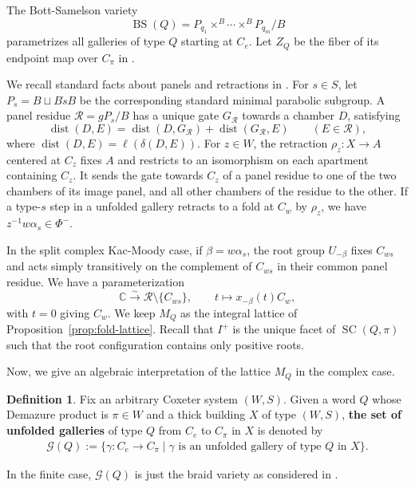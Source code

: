 \documentclass[11pt,a4paper]{article}
\theoremstyle{definition}
\newtheorem{definition}[theorem]{Definition}
\theoremstyle{remark}
\numberwithin{equation}{section}
\newcommand{\SCQ}{\operatorname{SC}(Q,\pi)}
\newcommand{\C}{\mathbb C}
\begin{document}
The Bott-Samelson variety
\[
 \operatorname{BS}(Q)=P_{q_1}\times^B\cdots\times^B P_{q_m}/B
\]
parametrizes all galleries of type $Q$ starting at $C_e$. Let $Z_Q$ be the fiber of its endpoint map over $C_\pi$ in \cite{BGS}.



We recall standard facts about panels and retractions in
\cite{AB}. For $s\in S$, let $P_s=B\sqcup B\dot{s}B$ be the
corresponding standard minimal parabolic subgroup. A panel residue $\mathcal R=gP_s/B$ has a unique gate $G_{\mathcal R}$ towards a chamber $D$, satisfying
\[
 \operatorname{dist}(D,E)
 =\operatorname{dist}(D,G_{\mathcal R})
   +\operatorname{dist}(G_{\mathcal R},E)
 \qquad(E\in\mathcal R),
\]
where $\operatorname{dist}(D,E)=\ell(\delta(D,E))$.
For $z\in W$, the retraction $\rho_z:X\to A$ centered at $C_z$ fixes $A$ and restricts to an isomorphism on
each apartment containing $C_z$. It sends the gate towards $C_z$ of a panel residue to one of the two chambers of its image panel, and all other chambers of the residue to the other.  If a type-$s$ step in a unfolded gallery retracts to a fold at $C_w$ by $\rho_z$, we have $z^{-1}w\alpha_s\in\Phi^-$.


In the split complex Kac-Moody case, if $\beta=w\alpha_s$,
the root group $U_{-\beta}$ fixes $C_{ws}$ and acts simply
transitively on the complement of $C_{ws}$ in their common panel residue. We have a parameterization
\[
 \C\xrightarrow{\sim}\mathcal R\setminus\{C_{ws}\},
 \qquad t\longmapsto x_{-\beta}(t)C_w,
\]
with $t=0$ giving $C_w$. We keep $M_Q$ as the integral lattice of Proposition~\ref{prop:fold-lattice}. Recall that $I^+$ is the unique facet of $\SCQ$ such that the root configuration contains only positive roots.


Now, we give an algebraic interpretation of the lattice $M_Q$ in the complex case.
\begin{definition}\label{def: com-braid-variety}
    Fix an arbitrary Coxeter system $(W,S)$. Given a word $Q$ whose Demazure product is $\pi\in W$ and a thick building $X$ of type $(W,S)$, \textbf{the set of unfolded galleries} of type $Q$ from $C_e$ to $C_{\pi}$ in $X$ is denoted by
    \begin{align}
        \mathcal{G}(Q):=\{ \gamma: C_e \longrightarrow C_{\pi} \mid \gamma \text{ is an unfolded gallery of type } Q \text{ in } X\}.
    \end{align}
\end{definition}
In the finite case, $\mathcal G(Q)$ is just the braid variety as considered in \cite{BGS}.
\end{document}
